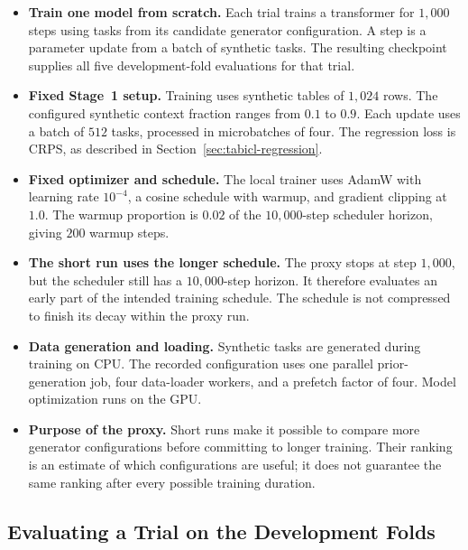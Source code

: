 \documentclass[11pt]{article}
\newenvironment{notes}
  {\begin{itemize}\setlength{\itemsep}{0.45em}\setlength{\parsep}{0pt}}
  {\end{itemize}}
\begin{document}
\begin{notes}
    \item \textbf{Train one model from scratch.}
    Each trial trains a transformer for \(1{,}000\) steps
    using tasks from its candidate generator configuration.
    A step is a parameter update from a batch of synthetic
    tasks. The resulting checkpoint supplies all five
    development-fold evaluations for that trial.

    \item \textbf{Fixed Stage~1 setup.}
    Training uses synthetic tables of \(1{,}024\) rows.
    The configured synthetic context fraction ranges from
    \(0.1\) to \(0.9\).
    Each update uses a batch of \(512\) tasks, processed
    in microbatches of four.
    The regression loss is CRPS, as described in
    Section~\ref{sec:tabicl-regression}.

    \item \textbf{Fixed optimizer and schedule.}
    The local trainer uses AdamW with learning rate
    \(10^{-4}\), a cosine schedule with warmup, and gradient
    clipping at \(1.0\).
    The warmup proportion is \(0.02\) of the
    \(10{,}000\)-step scheduler horizon, giving \(200\)
    warmup steps.

    \item \textbf{The short run uses the longer schedule.}
    The proxy stops at step \(1{,}000\), but the scheduler
    still has a \(10{,}000\)-step horizon.
    It therefore evaluates an early part of the intended
    training schedule. The schedule is not compressed to
    finish its decay within the proxy run.

    \item \textbf{Data generation and loading.}
    Synthetic tasks are generated during training on CPU.
    The recorded configuration uses one parallel
    prior-generation job, four data-loader workers, and
    a prefetch factor of four. Model optimization runs on
    the GPU.

    \item \textbf{Purpose of the proxy.}
    Short runs make it possible to compare more generator
    configurations before committing to longer training.
    Their ranking is an estimate of which configurations are
    useful; it does not guarantee the same ranking after
    every possible training duration.
\end{notes}

\subsection{Evaluating a Trial on the Development Folds}
\label{sec:transformer-development-evaluation}
\end{document}
